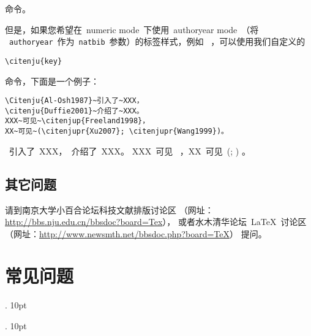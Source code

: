\documentclass[oneside, phd]{njuthesis}
\begin{document}
\noindent 命令。

但是，如果您希望在~numeric mode~下使用~authoryear mode~（将
 ~\texttt{authoryear}~作为~\texttt{natbib}~参数）的标签样式，例如~
，可以使用我们自定义的

\begin{verbatim}
\citenju{key}
\end{verbatim}

\noindent 命令，下面是一个例子：

\begin{verbatim}
\Citenju{Al-Osh1987}~引入了~XXX，
\citenju{Duffie2001}~介绍了~XXX。
XXX~可见~\citenjup{Freeland1998}，
XX~可见~(\citenjupr{Xu2007}; \citenjupr{Wang1999})。
\end{verbatim}

~引入了~XXX，~介绍了~XXX。 XXX~可见~
，XX~可见~(; )
。

\section{其它问题}

请到南京大学小百合论坛科技文献排版讨论区
（网址：\url{http://bbs.nju.edu.cn/bbsdoc?board=Tex}），
或者水木清华论坛~\LaTeX{}~讨论区
（网址：\url{http://www.newsmth.net/bbsdoc.php?board=TeX}）
提问。

\chapter{常见问题}
\label{C:FAQ}


  {}%
  {}%
  {\tt}%
  {}%
  {\bfseries}%
  {.}%
  {10pt}%
  {}%

  {}%
  {}%
  {\rm}%
  {}%
  {\bfseries}%
  {.}%
  {10pt}%
  {}%

\theoremstyle{question}
 \newtheorem{FAQ}{问题~}
\theoremstyle{answer}
 \newtheorem{ANS}{回答~}
\end{document}
